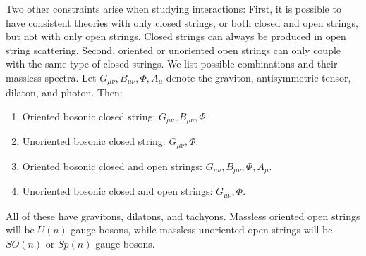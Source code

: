 Two other constraints arise when studying interactions: 
First, it is possible to have consistent theories with only closed strings, or both closed and open strings, but not with only open strings. Closed strings can always be produced in open string scattering. 
Second, oriented or unoriented open strings can only couple with the same type of closed strings. We list possible combinations and their massless spectra. Let $G_{\mu\nu}, B_{\mu\nu}, \Phi, A_\mu$ denote the graviton, antisymmetric tensor, dilaton, and photon. 
Then: 
\begin{enumerate}
	\item Oriented bosonic closed string: $G_{\mu\nu}, B_{\mu\nu}, \Phi$.
	\item Unoriented bosonic closed string: $G_{\mu\nu}, \Phi$.
	\item Oriented bosonic closed and open strings: $G_{\mu\nu}, B_{\mu\nu}, \Phi, A_\mu$.
	\item Unoriented bosonic closed and open strings: $G_{\mu\nu}, \Phi$.
\end{enumerate}
All of these have gravitons, dilatons, and tachyons. Massless oriented open strings will be $U(n)$ gauge bosons, while massless unoriented open strings will be $SO(n)$ or $Sp(n)$ gauge bosons. 